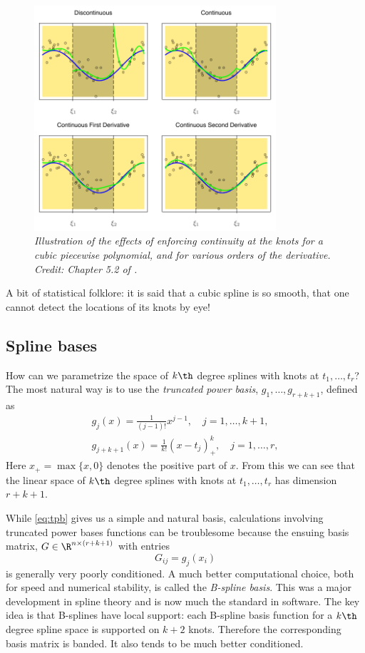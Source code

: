 \documentclass{article}
\begin{document}
\begin{figure}[tb]
\centering
\includegraphics[width=0.8\textwidth]{splines.pdf}
\caption{\it Illustration of the effects of enforcing continuity at the knots
  for a cubic piecewise polynomial, and for various orders of the derivative.
  Credit: Chapter 5.2 of \citet{hastie2009elements}.}    
\label{fig:splines}
\end{figure}

A bit of statistical folklore: it is said that a cubic spline is so smooth, that
one cannot detect the locations of its knots by eye! 

\subsection{Spline bases}

How can we parametrize the space of $k\th$ degree splines with knots at 
$t_1,\dots,t_r$?  The most natural way is to use the \emph{truncated power
  basis}, $g_1, \dots, g_{r+k+1}$, defined as   
\begin{equation}
\begin{gathered}
\label{eq:tpb}
g_j(x) = \frac{1}{(j-1)!} x^{j-1}, \quad j=1,\dots,k+1, \\
g_{j+k+1}(x) = \frac{1}{k!} (x-t_j)^k_+, \quad j=1,\dots,r,
\end{gathered}
\end{equation}
Here $x_+=\max\{x,0\}$ denotes the positive part of $x$. From this we can see
that the linear space of $k\th$ degree splines with knots at $t_1,\dots,t_r$ has 
dimension $r+k+1$.

While \eqref{eq:tpb} gives us a simple and natural basis, calculations involving
truncated power bases functions can be troublesome because the ensuing basis 
matrix, $G \in \R^{n \times (r+k+1)}$ with entries
\[
G_{ij} = g_j(x_i)
\]
is generally very poorly conditioned. A much better computational choice, both
for speed and numerical stability, is called the \emph{B-spline basis}. This was
a major development in spline theory and is now much the standard in
software. The key idea is that B-splines have local support: each B-spline basis
function for a $k\th$ degree spline space is supported on $k+2$ knots. Therefore
the corresponding basis matrix is banded. It also tends to be much better
conditioned.   
\end{document}
